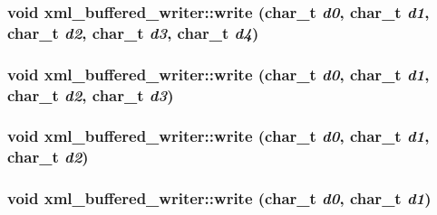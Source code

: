 \label{classxml__buffered__writer_ae6af5067d768c24b9c20422f76737f29}
\hypertarget{classxml__buffered__writer_aad4a4f18223ec3cb1ff607425119b85f}{
\subsubsection[{write}]{\setlength{\rightskip}{0pt plus 5cm}void xml\_\-buffered\_\-writer::write (char\_\-t {\em d0}, \/  char\_\-t {\em d1}, \/  char\_\-t {\em d2}, \/  char\_\-t {\em d3}, \/  char\_\-t {\em d4})}}
\label{classxml__buffered__writer_aad4a4f18223ec3cb1ff607425119b85f}
\hypertarget{classxml__buffered__writer_af679f459dfa0af257c190b8db57e7dcb}{
\subsubsection[{write}]{\setlength{\rightskip}{0pt plus 5cm}void xml\_\-buffered\_\-writer::write (char\_\-t {\em d0}, \/  char\_\-t {\em d1}, \/  char\_\-t {\em d2}, \/  char\_\-t {\em d3})}}
\label{classxml__buffered__writer_af679f459dfa0af257c190b8db57e7dcb}
\hypertarget{classxml__buffered__writer_af82b277c1ef5c75d1901bb5a8eb4507f}{
\subsubsection[{write}]{\setlength{\rightskip}{0pt plus 5cm}void xml\_\-buffered\_\-writer::write (char\_\-t {\em d0}, \/  char\_\-t {\em d1}, \/  char\_\-t {\em d2})}}
\label{classxml__buffered__writer_af82b277c1ef5c75d1901bb5a8eb4507f}
\hypertarget{classxml__buffered__writer_a4cd6e908908e17c9b07eba34f7317791}{
\subsubsection[{write}]{\setlength{\rightskip}{0pt plus 5cm}void xml\_\-buffered\_\-writer::write (char\_\-t {\em d0}, \/  char\_\-t {\em d1})}}
